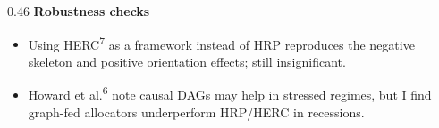 \documentclass[
	aspectratio=169,
	t,
	onlytextwidth,
	10pt,
]{beamer}
\newcommand{\cn}[1]{\textsuperscript{\textcolor{ICLBlue}{#1}}}
\newcommand{\refs}[1]{\ifx\\#1\\\else\footnotetext{\tiny\textcolor{ctrl}{#1}}\fi}
\begin{document}
\begin{frame}
\begin{columns}[T]
\begin{column}{0.46\linewidth}
			\textbf{Robustness checks}
			\begin{itemize}
				\setlength{\itemsep}{3pt}
				\item Using HERC\cn{7} as a framework instead of HRP reproduces the negative skeleton and positive orientation effects; still insignificant.
				\item Howard et al.\cn{6} note causal DAGs may help in stressed regimes, but I find graph-fed allocators underperform HRP/HERC in recessions.
			\end{itemize}
		\end{column}
	\end{columns}
	\refs{}
\end{frame}

\end{document}
